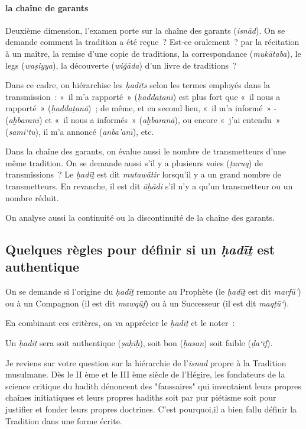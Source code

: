  \paragraph{la chaîne de garants}
  Deuxième dimension, l'examen porte sur la chaîne des garants
  (\emph{isnād}). On se demande comment la tradition a été reçue~?
  Est-ce oralement~? par la récitation à un maître, la remise d'une
  copie de traditions, la correspondance (\emph{mukātaba}), le legs
  (\emph{waṣiyya}), la découverte (\emph{wiğāda}) d'un livre de
  traditions~?
 
 
Dans ce cadre, on hiérarchise les \emph{ḥadīṯs} selon les termes
employés dans la transmission~: «~il m'a rapporté~» (\emph{ḥaddaṯanī})
est plus fort que «~il nous a rapporté~» (\emph{ḥaddaṯanā})~; de même,
et en second lieu, «~il m'a informé~» -(\emph{aḫbaranī}) et «~il nous a
informés~» (\emph{aḫbaranā}), ou encore «~j'ai entendu~»
(\emph{sami`tu}), il m'a annoncé (\emph{anba'anī}), etc.

Dans la chaîne des garants, on évalue aussi le nombre de transmetteurs
d'une même tradition. On se demande aussi s'il y a plusieurs voies
(\emph{ṭuruq}) de transmissions~? Le \emph{ḥadīṯ} est dit
\emph{mutawātir} lorsqu'il y a un grand nombre de transmetteurs. En
revanche, il est dit \emph{āḥādi} s'il n'y a qu'un transmetteur ou un
nombre réduit.
 

 
  On analyse aussi la continuité ou la discontinuité de la chaîne des
  garants.
 


\subsection{Quelques règles pour définir si un \emph{ḥadīṯ} est authentique}
On se demande si l'origine du \emph{ḥadīṯ} remonte au Prophète (le
\emph{ḥadīṯ} est dit \emph{marfū'}) ou à un Compagnon (il est dit
\emph{mawqūf}) ou à un Successeur (il est dit \emph{maqṭū`}).

En combinant ces critères, on va apprécier le \emph{ḥadīṯ} et le noter~:

\begin{Def}
Un \emph{ḥadīṯ} sera soit authentique (\emph{ṣaḥīḥ}), soit bon (\emph{ḥasan}) soit
faible (\emph{ḍa`īf}).

\end{Def}

Je reviens sur votre question sur la hiérarchie de l'\emph{isnad} propre à la Tradition musulmane. 
Dès le II ème et le III ème siècle de l'Hégire, les fondateurs de la science critique du hadith dénoncent des "faussaires" qui inventaient leurs propres chaînes initiatiques et leurs propres hadiths soit par pur piétisme soit pour justifier et fonder leurs propres doctrines. C'est pourquoi,il a bien fallu définir la Tradition dans une forme écrite. 

